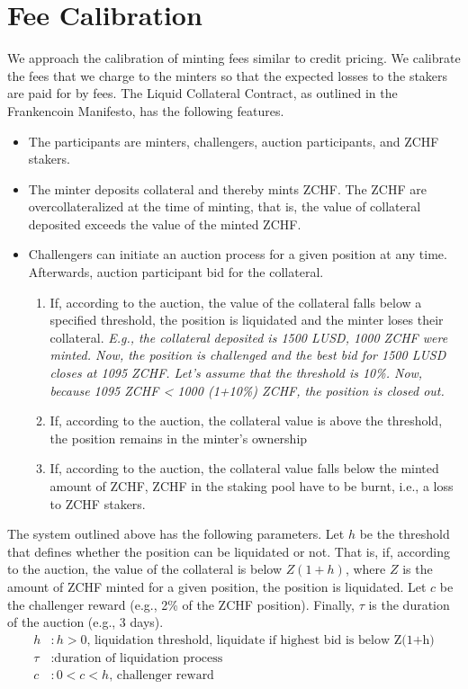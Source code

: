 \documentclass[english,11pt]{article}
\begin{document}
\section{Fee Calibration}
We approach the calibration of minting fees similar to credit pricing. We calibrate the fees that we charge to the minters 
so that the expected losses to the stakers are paid for by fees.
The Liquid Collateral Contract, as outlined in the Frankencoin Manifesto, has the following features.
\begin{itemize}
\item The participants are minters, challengers, auction participants, and ZCHF stakers.
\item The minter deposits collateral and thereby mints ZCHF. The ZCHF are overcollateralized at the time
of minting, that is, the value of collateral deposited exceeds the value of the minted ZCHF.
\item Challengers can initiate an auction process for a given position at any time. Afterwards, auction participant
bid for the collateral.
\begin{enumerate}
\item If, according to the auction, the value of the collateral falls below a specified threshold, the position is liquidated
and the minter loses their collateral. \emph{E.g., the collateral deposited is 1500 LUSD, 1000 ZCHF were minted. Now, the position
is challenged and the best bid for 1500 LUSD closes at 1095 ZCHF. Let's assume that the threshold is 10\%. Now, because 
1095 ZCHF < 1000 (1+10\%) ZCHF, the position is closed out.}
\item If, according to the auction, the collateral value is above the threshold, the position remains in the
minter's ownership
\item If, according to the auction, the collateral value falls below the minted amount of ZCHF, ZCHF in the staking pool have to be burnt, i.e.,
a loss to ZCHF stakers.
\end{enumerate}
\end{itemize}

The system outlined above has the following parameters. Let $h$ be the threshold that defines whether the position
can be liquidated or not. That is, if, according to the auction, the value of the collateral is below 
$Z(1+h)$, where $Z$ is the amount of ZCHF minted for a given position, the position is liquidated.
Let $c$ be the challenger reward (e.g., 2\% of the ZCHF position). Finally, $\tau$ is the duration of the auction
(e.g., 3 days).
\begin{align}
h &: \text{$h>0$, liquidation threshold, liquidate if highest bid is below Z(1+h)}\\
\tau &: \text{duration of liquidation process}\\
c &: \text{$0<c<h$, challenger reward}
\end{align}
\end{document}

